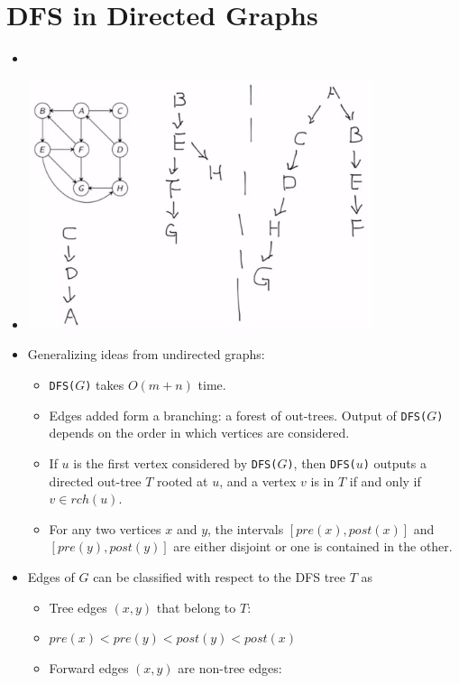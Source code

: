 \section{DFS in Directed Graphs}
\begin{itemize}
    \item[] 
    \item[] \includegraphics[width=0.8\textwidth]{lecture17/images/directed-dfs-tree-time.jpg}
    \item Generalizing ideas from undirected graphs:
    \begin{itemize}
        \item \texttt{DFS($G$)} takes $O(m + n)$ time.
        \item Edges added form a branching: a forest of out-trees. Output of \texttt{DFS($G$)} depends on the order in which vertices are considered.
        \item If $u$ is the first vertex considered by \texttt{DFS($G$)}, then \texttt{DFS($u$)} outputs a directed out-tree $T$ rooted at $u$, and a vertex $v$ is in $T$ if and only if $v \in rch(u)$.
        \item For any two vertices $x$ and $y$, the intervals $[pre(x), post(x)]$ and $[pre(y), post(y)]$ are either disjoint or one is contained in the other.
    \end{itemize}
    \item Edges of $G$ can be classified with respect to the DFS tree $T$ as
    \begin{itemize}
        \item Tree edges $(x, y)$ that belong to $T$:
        \item[] $pre(x) < pre(y) < post(y) < post(x)$
        \item Forward edges $(x, y)$ are non-tree edges:

\end{itemize}
\end{itemize}
